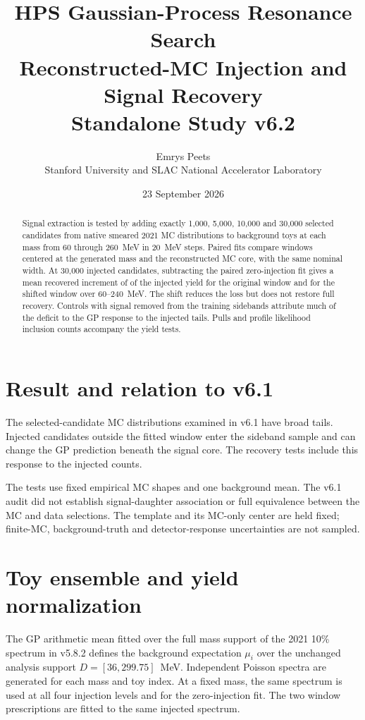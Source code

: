 \documentclass[11pt]{article}
\title{HPS Gaussian-Process Resonance Search\\[.5em]
\large Reconstructed-MC Injection and Signal Recovery\\Standalone Study v6.2}
\author{Emrys Peets\\Stanford University and SLAC National Accelerator Laboratory}
\date{23 September 2026}
\begin{document}
\maketitle
\begin{abstract}
Signal extraction is tested by adding exactly 1,000, 5,000, 10,000 and
30,000 selected candidates from native smeared 2021 MC distributions to
\ToyCount{} background toys at each mass from 60 through 260~MeV in
20~MeV steps. Paired fits compare windows centered at the generated mass
and the reconstructed MC core, with the same nominal width. At 30,000
injected candidates, subtracting the paired zero-injection fit gives a
mean recovered increment of \IncPoleRange{} of the injected yield for
the original window and \IncCoreRange{} for the shifted window over
60--240~MeV. The shift reduces the loss but does not restore full
recovery. Controls with signal removed from the training sidebands
attribute much of the deficit to the GP response to the injected tails.
Pulls and profile likelihood inclusion counts accompany the yield tests.
\end{abstract}

\section{Result and relation to v6.1}
The selected-candidate MC distributions examined in v6.1 have broad
tails. Injected candidates outside the fitted window enter the sideband
sample and can change the GP prediction beneath the signal core. The
recovery tests include this response to the injected counts.

\begin{table}[H]\centering\small

\caption{Ranges of the mean fitted yield divided by the injected yield
over 60--240~MeV. These summarize the ten mass points; they are not
confidence intervals. The low-injection ratios include the background
offset and should be read with their toy errors in Figure~\ref{fig:recovery}.}
\end{table}

The tests use fixed empirical MC shapes and one background mean. The
v6.1 audit did not establish signal-daughter association or full
equivalence between the MC and data selections. The template and its
MC-only center are held fixed; finite-MC, background-truth and
detector-response uncertainties are not sampled.

\clearpage
\section{Toy ensemble and yield normalization}
The GP arithmetic mean fitted over the full mass support of the 2021
10\% spectrum in v5.8.2 defines the background expectation $\mu_i$ over the unchanged analysis
support $D=[36,299.75]$~MeV. Independent Poisson spectra are generated
for each mass and toy index. At a fixed mass, the same spectrum is used
at all four injection levels and for the zero-injection fit. The two
window prescriptions are fitted to the same injected spectrum.
\end{document}
